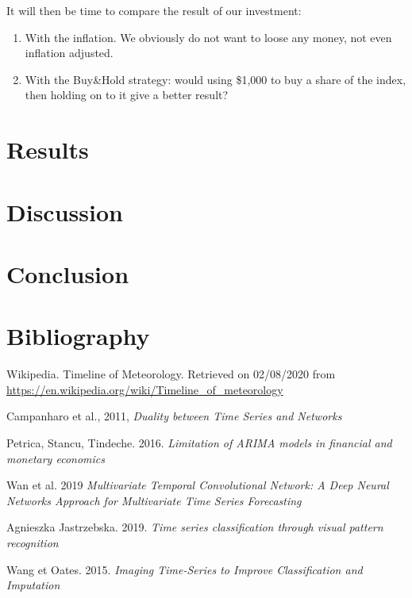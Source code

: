 \documentclass[11pt]{article}
\begin{document}
\begin{onehalfspace}
It will then be time to compare the result of our investment:

\begin{enumerate}
    \item With the inflation. We obviously do not want to loose any money, not even inflation adjusted.
    \item With the Buy\&Hold strategy: would using \$1,000 to buy a share of the index, then holding on to it give a better result?
\end{enumerate}

\pagebreak

\section{Results}
\label{results}

\section{Discussion}
\label{discuss}

\section{Conclusion}
\label{concl}

\section{Bibliography}

\begin{thebibliography}{9}
    Wikipedia. Timeline of Meteorology. Retrieved on 02/08/2020 from \url{https://en.wikipedia.org/wiki/Timeline_of_meteorology}

    Campanharo et al., 2011, \textit{Duality between Time Series and Networks}

    Petrica, Stancu, Tindeche. 2016. \textit{Limitation of ARIMA models in financial and monetary economics}

    Wan et al. 2019 \textit{Multivariate Temporal Convolutional Network: A Deep Neural Networks Approach for Multivariate Time Series Forecasting}

    Agnieszka Jastrzebska. 2019. \textit{Time series classification through visual pattern recognition}

    Wang et Oates. 2015. \textit{Imaging Time-Series to Improve Classification and Imputation}


\end{thebibliography}
\end{onehalfspace}
\end{document}
